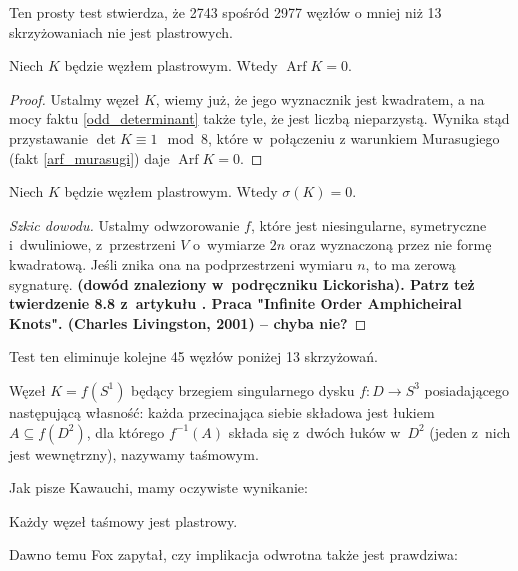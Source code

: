 Ten prosty test stwierdza, że 2743 spośród 2977 węzłów o mniej niż 13 skrzyżowaniach nie jest plastrowych.

\begin{proposition}
    Niech $K$ będzie węzłem plastrowym.
    Wtedy $\operatorname{Arf} K = 0$.
\end{proposition}

\begin{proof}
    Ustalmy węzeł $K$, wiemy już, że jego wyznacznik jest kwadratem, a na mocy faktu \ref{odd_determinant} także tyle, że jest liczbą nieparzystą.
    Wynika stąd przystawanie $\det K \equiv 1 \mod 8$, które w~połączeniu z warunkiem Murasugiego (fakt \ref{arf_murasugi}) daje $\operatorname{Arf} K = 0$.
\end{proof}

\begin{proposition} \label{slice_signature}
    Niech $K$ będzie węzłem plastrowym.
    Wtedy $\sigma(K) = 0$.
\end{proposition}

\begin{proof}[Szkic dowodu]
    Ustalmy odwzorowanie $f$, które jest niesingularne, symetryczne i~dwuliniowe, z~przestrzeni $V$ o~wymiarze $2n$ oraz wyznaczoną przez nie formę kwadratową.
    Jeśli znika ona na podprzestrzeni wymiaru $n$, to ma zerową sygnaturę.
    \textbf{(dowód znaleziony w~podręczniku Lickorisha).
    Patrz też twierdzenie 8.8 z~artykułu \cite{murasugi65}.
    Praca "Infinite Order Amphicheiral Knots". (Charles Livingston, 2001) -- chyba nie?}
\end{proof}

Test ten eliminuje kolejne 45 węzłów poniżej 13 skrzyżowań.

\begin{definition}
    Węzeł $K = f(S^1)$ będący brzegiem singularnego dysku $f \colon D \to S^3$ posiadającego następującą własność: każda przecinająca siebie składowa jest łukiem $A \subseteq f(D^2)$, dla którego $f^{-1}(A)$ składa się z~dwóch łuków w~$D^2$ (jeden z~nich jest wewnętrzny), nazywamy taśmowym.
\end{definition}

Jak pisze Kawauchi, mamy oczywiste wynikanie:

\begin{proposition}
    Każdy węzeł taśmowy jest plastrowy.
\end{proposition}

Dawno temu Fox zapytał, czy implikacja odwrotna także jest prawdziwa:

